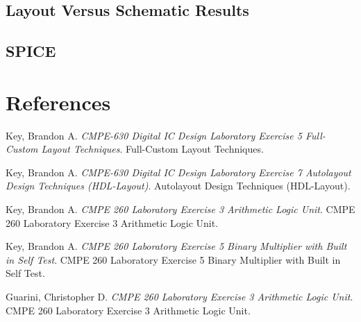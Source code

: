 \documentclass[11pt]{article}
\begin{document}
		
		
		
		
		
		
		
		
		
		
	\subsection{Layout Versus Schematic Results}
	
		
		
	\subsection{SPICE}
	
		
		
		
		
		

		
\section{References}

	Key, Brandon A. \textit{CMPE-630 Digital IC Design Laboratory Exercise 5 Full-Custom Layout Techniques}. Full-Custom Layout Techniques.
	
	Key, Brandon A. \textit{CMPE-630 Digital IC Design Laboratory Exercise 7 Autolayout Design Techniques (HDL-Layout)}. Autolayout Design Techniques (HDL-Layout).
	
	Key, Brandon A. \textit{CMPE 260 Laboratory Exercise 3 Arithmetic Logic Unit}. CMPE 260 Laboratory Exercise 3 Arithmetic Logic Unit.
	
	Key, Brandon A. \textit{CMPE 260 Laboratory Exercise 5 Binary Multiplier with Built in Self Test}. CMPE 260 Laboratory Exercise 5 Binary Multiplier with Built in Self Test.
	
	Guarini, Christopher D. \textit{CMPE 260 Laboratory Exercise 3 Arithmetic Logic Unit}. CMPE 260 Laboratory Exercise 3 Arithmetic Logic Unit.
\end{document}
